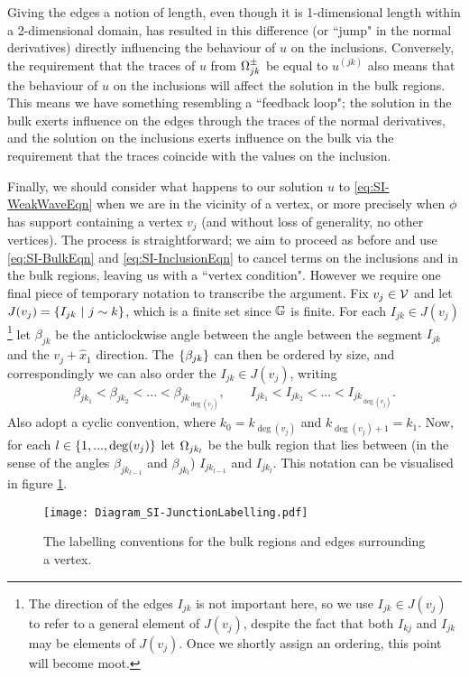 Giving the edges a notion of length, even though it is 1-dimensional length within a 2-dimensional domain, has resulted in this difference (or ``jump" in the normal derivatives) directly influencing the behaviour of $u$ on the inclusions.
Conversely, the requirement that the traces of $u$ from $\Omega_{jk}^{\pm}$ be equal to $u^{(jk)}$ also means that the behaviour of $u$ on the inclusions will affect the solution in the bulk regions.
This means we have something resembling a ``feedback loop"; the solution in the bulk exerts influence on the edges through the traces of the normal derivatives, and the solution on the inclusions exerts influence on the bulk via the requirement that the traces coincide with the values on the inclusion.

Finally, we should consider what happens to our solution $u$ to \eqref{eq:SI-WeakWaveEqn} when we are in the vicinity of a vertex, or more precisely when $\phi$ has support containing a vertex $v_j$ (and without loss of generality, no other vertices).
The process is straightforward; we aim to proceed as before and use \eqref{eq:SI-BulkEqn} and \eqref{eq:SI-InclusionEqn} to cancel terms on the inclusions and in the bulk regions, leaving us with a ``vertex condition".
However we require one final piece of temporary notation to transcribe the argument.
Fix $v_j\in\mathcal{V}$ and let $J(v_j) = \left\{ I_{jk} \ \middle\vert \  j\sim k \right\}$, which is a finite set since $\mathbb{G}$ is finite.
For each $I_{jk}\in J(v_j)$
\footnote{The direction of the edges $I_{jk}$ is not important here, so we use  $I_{jk}\in J(v_j)$ to refer to a general element of $J(v_j)$, despite the fact that both $I_{kj}$ and $I_{jk}$ may be elements of $J(v_j)$. 
Once we shortly assign an ordering, this point will become moot.} 
let $\beta_{jk}$ be the anticlockwise angle between the angle between the segment $I_{jk}$ and the $v_j+\hat{x}_1$ direction.
The $\left\{ \beta_{jk} \right\}$ can then be ordered by size, and correspondingly we can also order the $I_{jk}\in J(v_j)$, writing
\begin{align*}
	\beta_{jk_1} < \beta_{jk_2} < ... < \beta_{jk_{\deg(v_j)}}, 
	\qquad I_{jk_1} < I_{jk_2} < ... < I_{jk_{\deg(v_j)}}.
\end{align*}
Also adopt a cyclic convention, where $k_0 = k_{\deg(v_j)}$ and $k_{\deg(v_j)+1} = k_1$.
Now, for each $l\in\left\{ 1,...,\deg(v_j) \right\}$ let $\Omega_{jk_l}$ be the bulk region that lies between (in the sense of the angles $\beta_{jk_{l-1}}$ and $\beta_{jk_l}$) $I_{jk_{l-1}}$ and $I_{jk_l}$.
This notation can be visualised in figure \ref{fig:Diagram_SI-JunctionLabelling}.
\begin{figure}[h]
	\centering
	\texttt{[image: Diagram\_SI-JunctionLabelling.pdf]}
	\caption{\label{fig:Diagram_SI-JunctionLabelling} The labelling conventions for the bulk regions and edges surrounding a vertex.}
\end{figure}

